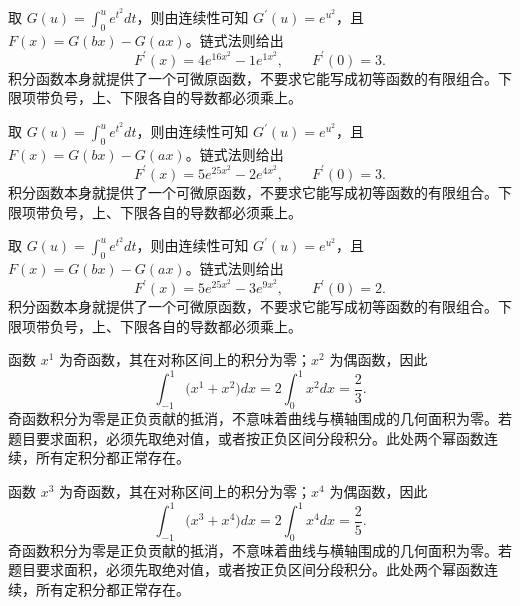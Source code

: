 \documentclass[12pt,fontset=fandol]{ctexart}
\begin{document}
\begin{solve}\label{ans:c17q12}
取 $G(u)=\int_0^u e^{t^2}dt$，则由连续性可知 $G^{\prime}(u)=e^{u^2}$，且 $F(x)=G(bx)-G(ax)$。链式法则给出
\[
F^{\prime}(x)=4e^{16x^2}-1e^{1x^2},\qquad F^{\prime}(0)=3.
\]
积分函数本身就提供了一个可微原函数，不要求它能写成初等函数的有限组合。下限项带负号，上、下限各自的导数都必须乘上。
\end{solve}

\begin{solve}\label{ans:c17q13}
取 $G(u)=\int_0^u e^{t^2}dt$，则由连续性可知 $G^{\prime}(u)=e^{u^2}$，且 $F(x)=G(bx)-G(ax)$。链式法则给出
\[
F^{\prime}(x)=5e^{25x^2}-2e^{4x^2},\qquad F^{\prime}(0)=3.
\]
积分函数本身就提供了一个可微原函数，不要求它能写成初等函数的有限组合。下限项带负号，上、下限各自的导数都必须乘上。
\end{solve}

\begin{solve}\label{ans:c17q14}
取 $G(u)=\int_0^u e^{t^2}dt$，则由连续性可知 $G^{\prime}(u)=e^{u^2}$，且 $F(x)=G(bx)-G(ax)$。链式法则给出
\[
F^{\prime}(x)=5e^{25x^2}-3e^{9x^2},\qquad F^{\prime}(0)=2.
\]
积分函数本身就提供了一个可微原函数，不要求它能写成初等函数的有限组合。下限项带负号，上、下限各自的导数都必须乘上。
\end{solve}

\begin{solve}\label{ans:c17q15}
函数 $x^{1}$ 为奇函数，其在对称区间上的积分为零；$x^{2}$ 为偶函数，因此
\[
\int_{-1}^1\bigl(x^{1}+x^{2}\bigr)dx=2\int_0^1x^{2}dx=\frac{2}{3}.
\]
奇函数积分为零是正负贡献的抵消，不意味着曲线与横轴围成的几何面积为零。若题目要求面积，必须先取绝对值，或者按正负区间分段积分。此处两个幂函数连续，所有定积分都正常存在。
\end{solve}

\begin{solve}\label{ans:c17q16}
函数 $x^{3}$ 为奇函数，其在对称区间上的积分为零；$x^{4}$ 为偶函数，因此
\[
\int_{-1}^1\bigl(x^{3}+x^{4}\bigr)dx=2\int_0^1x^{4}dx=\frac{2}{5}.
\]
奇函数积分为零是正负贡献的抵消，不意味着曲线与横轴围成的几何面积为零。若题目要求面积，必须先取绝对值，或者按正负区间分段积分。此处两个幂函数连续，所有定积分都正常存在。
\end{solve}
\end{document}
